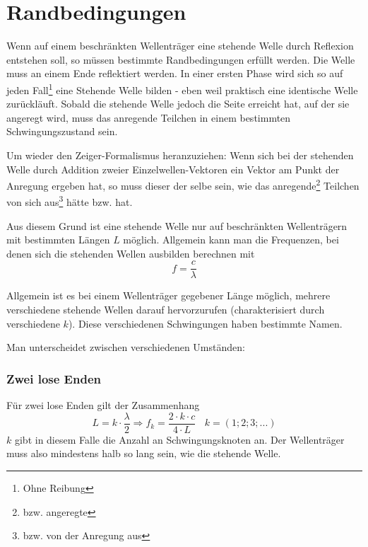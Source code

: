 			\section{Randbedingungen}
			\label{sss_randbedingungen}

Wenn auf einem beschränkten Wellenträger eine stehende Welle durch Reflexion entstehen soll, so müssen bestimmte Randbedingungen erfüllt werden. Die Welle muss an einem Ende reflektiert werden. In einer ersten Phase wird sich so auf jeden Fall\footnote{Ohne Reibung} eine Stehende Welle bilden - eben weil praktisch eine identische Welle zurückläuft. Sobald die stehende Welle jedoch die Seite erreicht hat, auf der sie angeregt wird, muss das anregende Teilchen in einem bestimmten Schwingungszustand sein. 

Um wieder den Zeiger-Formalismus heranzuziehen: Wenn sich bei der stehenden Welle durch Addition zweier Einzelwellen-Vektoren ein Vektor am Punkt der Anregung ergeben hat, so muss dieser der selbe sein, wie das anregende\footnote{bzw. angeregte} Teilchen von sich aus\footnote{bzw. von der Anregung aus} hätte bzw. hat.

Aus diesem Grund ist eine stehende Welle nur auf beschränkten Wellenträgern mit bestimmten Längen \(L\) möglich. Allgemein kann man die Frequenzen, bei denen sich die stehenden Wellen ausbilden berechnen mit 
\begin{equation}
 f = \frac{c}{\lambda}
\end{equation}

Allgemein ist es bei einem Wellenträger gegebener Länge möglich, mehrere verschiedene stehende Wellen darauf hervorzurufen (charakterisiert durch verschiedene \(k\)). Diese verschiedenen Schwingungen haben bestimmte Namen.


Man unterscheidet zwischen verschiedenen Umständen:


\subsubsection{Zwei lose Enden}

Für zwei lose Enden gilt der Zusammenhang
\begin{equation}
 	L = k \cdot \frac{\lambda}{2} \Rightarrow f_k = \frac{2 \cdot k \cdot c}{4 \cdot L} ~~~~ k = (1;2;3;...)
 	\label{eq_2lose}
\end{equation}
\(k\) gibt in diesem Falle die Anzahl an Schwingungsknoten an. Der Wellenträger muss also mindestens halb so lang sein, wie die stehende Welle. 


